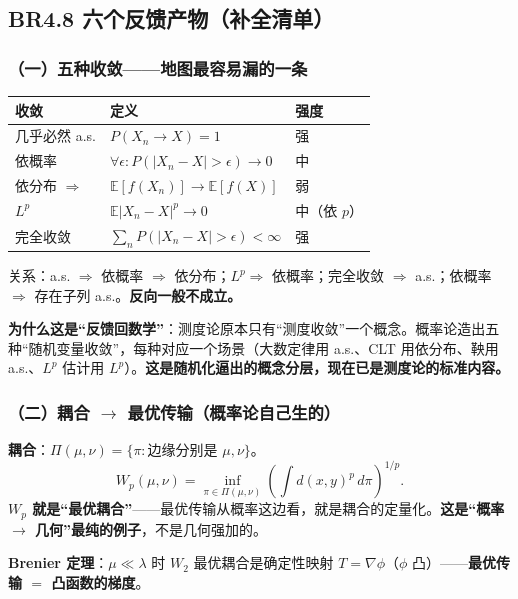 \subsection{BR4.8 六个反馈产物（补全清单）}

\subsubsection{（一）五种收敛——地图最容易漏的一条}

\begin{center}
\begin{tabular}{L{3.2cm}L{5.5cm}L{3.5cm}}
\toprule
\textbf{收敛} & \textbf{定义} & \textbf{强度} \\
\midrule
几乎必然 a.s. & $P(X_n\to X)=1$ & 强 \\
依概率 & $\forall\epsilon:P(|X_n-X|>\epsilon)\to0$ & 中 \\
依分布 $\Rightarrow$ & $\mathbb{E}[f(X_n)]\to\mathbb{E}[f(X)]$ & 弱 \\
$L^p$ & $\mathbb{E}|X_n-X|^p\to0$ & 中（依 $p$） \\
完全收敛 & $\sum_nP(|X_n-X|>\epsilon)<\infty$ & 强 \\
\bottomrule
\end{tabular}
\end{center}

关系：a.s. $\Rightarrow$ 依概率 $\Rightarrow$ 依分布；$L^p\Rightarrow$ 依概率；完全收敛 $\Rightarrow$ a.s.；依概率 $\Rightarrow$ 存在子列 a.s.。\textbf{反向一般不成立。}

\textbf{为什么这是“反馈回数学”}：测度论原本只有“测度收敛”一个概念。概率论造出五种“随机变量收敛”，每种对应一个场景（大数定律用 a.s.、CLT 用依分布、鞅用 a.s.、$L^p$ 估计用 $L^p$）。\textbf{这是随机化逼出的概念分层，现在已是测度论的标准内容。}

\subsubsection{（二）耦合 $\to$ 最优传输（概率论自己生的）}

\textbf{耦合}：$\Pi(\mu,\nu)=\{\pi:\text{边缘分别是 }\mu,\nu\}$。
\[
W_p(\mu,\nu)=\inf_{\pi\in\Pi(\mu,\nu)}\left(\int d(x,y)^p\,d\pi\right)^{1/p}.
\]
\textbf{$W_p$ 就是“最优耦合”}——最优传输从概率这边看，就是耦合的定量化。\textbf{这是“概率 $\to$ 几何”最纯的例子}，不是几何强加的。

\textbf{Brenier 定理}：$\mu\ll\lambda$ 时 $W_2$ 最优耦合是确定性映射 $T=\nabla\phi$（$\phi$ 凸）——\textbf{最优传输 $=$ 凸函数的梯度}。

